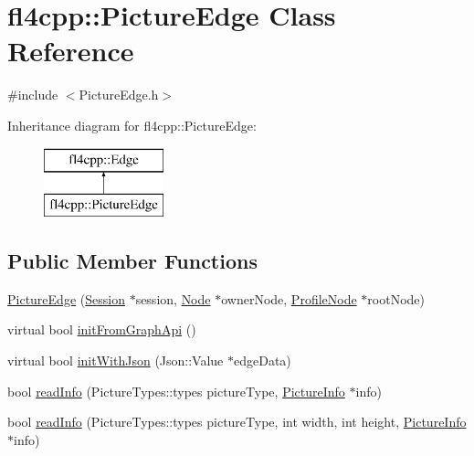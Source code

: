 \hypertarget{classfl4cpp_1_1_picture_edge}{}\section{fl4cpp\+:\+:Picture\+Edge Class Reference}
\label{classfl4cpp_1_1_picture_edge}


{\ttfamily \#include $<$Picture\+Edge.\+h$>$}

Inheritance diagram for fl4cpp\+:\+:Picture\+Edge\+:\begin{figure}[H]
\begin{center}
\leavevmode
\includegraphics[height=2.000000cm]{classfl4cpp_1_1_picture_edge}
\end{center}
\end{figure}
\subsection*{Public Member Functions}
\begin{DoxyCompactItemize}
\item 
\hyperlink{classfl4cpp_1_1_picture_edge_ae613733ba5c1338ecec6ea7b4fe66fdc}{Picture\+Edge} (\hyperlink{classfl4cpp_1_1_session}{Session} $\ast$session, \hyperlink{classfl4cpp_1_1_node}{Node} $\ast$owner\+Node, \hyperlink{classfl4cpp_1_1_profile_node}{Profile\+Node} $\ast$root\+Node)
\item 
virtual bool \hyperlink{classfl4cpp_1_1_picture_edge_a09a911705391d81ae81e146f0a7acf08}{init\+From\+Graph\+Api} ()
\item 
virtual bool \hyperlink{classfl4cpp_1_1_picture_edge_acf1562c98f091b348b0bfe55212b85ff}{init\+With\+Json} (Json\+::\+Value $\ast$edge\+Data)
\item 
bool \hyperlink{classfl4cpp_1_1_picture_edge_a8a222b9970aa2d1f13b878b35d9730ac}{read\+Info} (Picture\+Types\+::types picture\+Type, \hyperlink{classfl4cpp_1_1_picture_info}{Picture\+Info} $\ast$info)
\item 
bool \hyperlink{classfl4cpp_1_1_picture_edge_ac494e60f63dae9abfffe51c869a329d7}{read\+Info} (Picture\+Types\+::types picture\+Type, int width, int height, \hyperlink{classfl4cpp_1_1_picture_info}{Picture\+Info} $\ast$info)
\end{DoxyCompactItemize}
